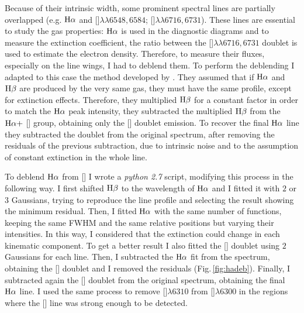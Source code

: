\documentclass[../main.tex]{subfiles}
\begin{document}
Because of their intrinsic width, some prominent spectral lines are partially overlapped (e.g. $\rm H\alpha$ and []$\lambda\lambda6548,6584$; []$\lambda\lambda6716,6731$).
These lines are essential to study the gas properties: $\rm H\alpha$ is used in the diagnostic diagrams \citep{Baldwin81,Veilleux87} and to measure the extinction coefficient, the ratio between the []$\lambda\lambda6716,6731$ doublet is used to estimate the electron density.
Therefore, to measure their fluxes, especially on the line wings, I had to deblend them.
To perform the deblending I adapted to this case the method developed by \citet{Schirmer13}.
They assumed that if $\rm H\alpha$ and $\rm H\beta$ are produced by the very same gas, they must have the same profile, except for extinction effects.
Therefore, they multiplied $\rm H\beta$ for a constant factor in order to match the $\rm H\alpha$ peak intensity, they subtracted the multiplied $\rm H\beta$ from the $\rm H\alpha +$ [] group, obtaining only the [] doublet emission.
To recover the final $\rm H\alpha$ line they subtracted the doublet from the original spectrum, after removing the residuals of the previous subtraction, due to intrinsic noise and to the assumption of constant extinction in the whole line.

To deblend $\rm H\alpha$ from [] I wrote a \textit{python 2.7} script, modifying this process in the following way. 
I first shifted $\rm H\beta$ to the wavelength of $\rm H\alpha$ and I fitted it with $2$ or $3$ Gaussians, trying to reproduce the line profile and selecting the result showing the minimum residual.
Then, I fitted $\rm H\alpha$ with the same number of functions, keeping the same FWHM and the same relative positions but varying their intensities.
In this way, I considered that the extinction could change in each kinematic component.
To get a better result I also fitted the [] doublet using $2$ Gaussians for each line.
Then, I subtracted the $\rm H\alpha$ fit from the spectrum, obtaining the [] doublet and I removed the residuals (Fig.\,\ref{fig:hadeb}).
Finally, I subtracted again the [] doublet from the original spectrum, obtaining the final $\rm H\alpha$ line.
I used the same process to remove []$\lambda6310$ from []$\lambda6300$ in the regions where the [] line was strong enough to be detected.
\end{document}
